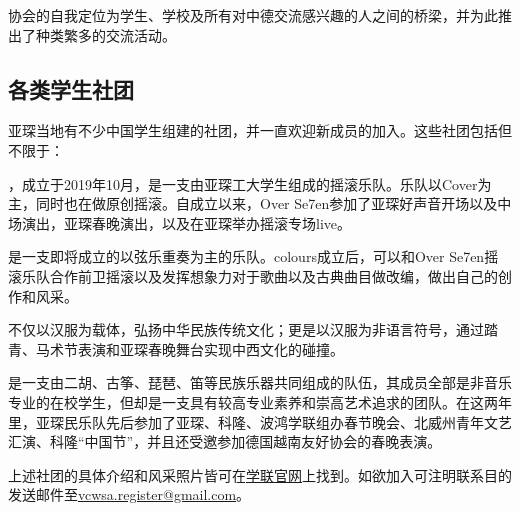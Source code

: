     协会的自我定位为学生、学校及所有对中德交流感兴趣的人之间的桥梁，并为此推出了种类繁多的交流活动。

  \subsection{各类学生社团}\label{subsec:各类学生社团}

    亚琛当地有不少中国学生组建的社团，并一直欢迎新成员的加入。这些社团包括但不限于：

    ，成立于2019年10月，是一支由亚琛工大学生组成的摇滚乐队。乐队以Cover为主，同时也在做原创摇滚。自成立以来，Over Se7en参加了亚琛好声音开场以及中场演出，亚琛春晚演出，以及在亚琛举办摇滚专场live。

    是一支即将成立的以弦乐重奏为主的乐队。colours成立后，可以和Over Se7en摇滚乐队合作前卫摇滚以及发挥想象力对于歌曲以及古典曲目做改编，做出自己的创作和风采。

    不仅以汉服为载体，弘扬中华民族传统文化；更是以汉服为非语言符号，通过踏青、马术节表演和亚琛春晚舞台实现中西文化的碰撞。

    是一支由二胡、古筝、琵琶、笛等民族乐器共同组成的队伍，其成员全部是非音乐专业的在校学生，但却是一支具有较高专业素养和崇高艺术追求的团队。在这两年里，亚琛民乐队先后参加了亚琛、科隆、波鸿学联组办春节晚会、北威州青年文艺汇演、科隆“中国节”，并且还受邀参加德国越南友好协会的春晚表演。

    上述社团的具体介绍和风采照片皆可在\href{http://www.vcwsa.rwth-aachen.de/category/lives/社团风采/}{学联官网}上找到。如欲加入可注明联系目的发送邮件至\href{mailto:vcwsa.register@gmail.com}{vcwsa.register@gmail.com}。
